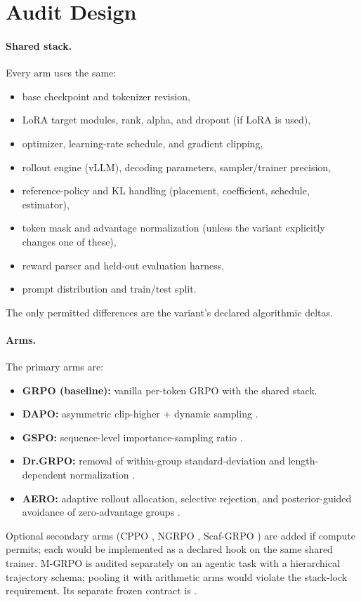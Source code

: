 \documentclass[11pt]{article}
\newcommand{\grpo}{\textsc{GRPO}}
\begin{document}
\section{Audit Design}
\label{sec:design}


\paragraph{Shared stack.} Every arm uses the same:
\begin{itemize}[leftmargin=1.4em, itemsep=2pt]
  \item base checkpoint and tokenizer revision,
  \item LoRA target modules, rank, alpha, and dropout (if LoRA is used),
  \item optimizer, learning-rate schedule, and gradient clipping,
  \item rollout engine (vLLM), decoding parameters, sampler/trainer precision,
  \item reference-policy and KL handling (placement, coefficient, schedule,
    estimator),
  \item token mask and advantage normalization (unless the variant explicitly
    changes one of these),
  \item reward parser and held-out evaluation harness,
  \item prompt distribution and train/test split.
\end{itemize}
The only permitted differences are the variant's declared algorithmic deltas.

\paragraph{Arms.} The primary arms are:
\begin{itemize}[leftmargin=1.4em, itemsep=2pt]
  \item \textbf{GRPO (baseline):} vanilla per-token GRPO with the shared stack.
  \item \textbf{DAPO:} asymmetric clip-higher + dynamic sampling
    \cite{yu2025dapo}.
  \item \textbf{GSPO:} sequence-level importance-sampling ratio
    \cite{qwen2025gspo}.
  \item \textbf{Dr.\grpo{}:} removal of within-group standard-deviation and
    length-dependent normalization
    \cite{tong2025drgrpo}.
  \item \textbf{AERO:} adaptive rollout allocation, selective rejection, and
    posterior-guided avoidance of zero-advantage groups \cite{zhang2026aero}.
\end{itemize}
Optional secondary arms (CPPO \cite{lin2025cppo}, NGRPO
\cite{nan2025ngrpo}, Scaf-\grpo{} \cite{zhang2025scaffgrpo}) are added if compute
permits; each would be implemented as a declared hook on the same shared trainer.
M-\grpo{} \cite{hong2025mgrpo} is audited separately on an agentic task with a
hierarchical trajectory schema; pooling it with arithmetic arms would violate
the stack-lock requirement. Its separate frozen contract is
.
\end{document}
